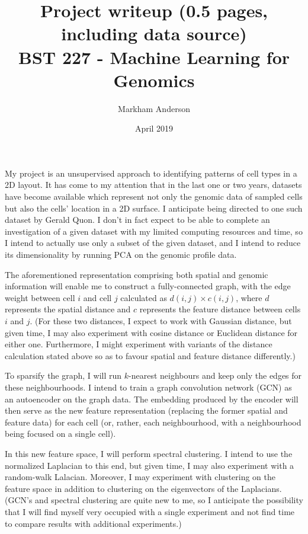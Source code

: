 \documentclass{article}
\title{Project writeup (0.5 pages, including data source) \\
\large BST 227 - Machine Learning for Genomics}
\author{Markham Anderson}
\date{April 2019}
\begin{document}
\maketitle


\normalsize
My project is an unsupervised approach to identifying patterns of cell types in a 2D layout. It has come to my attention that in the last one or two years, datasets have become available which represent not only the genomic data of sampled cells but also the cells' location in a 2D surface. I anticipate being directed to one such dataset by Gerald Quon. I don't in fact expect to be able to complete an investigation of a given dataset with my limited computing resources and time, so I intend to actually use only a subset of the given dataset, and I intend to reduce its dimensionality by running PCA on the genomic profile data.

The aforementioned representation comprising both spatial and genomic information will enable me to construct a fully-connected graph, with the edge weight between cell $i$ and cell $j$ calculated as $d(i,j)\times c(i,j)$, where $d$ represents the spatial distance and $c$ represents the feature distance between cells $i$ and $j$. (For these two distances, I expect to work with Gaussian distance, but given time, I may also experiment with cosine distance or Euclidean distance for either one. Furthermore, I might experiment with variants of the distance calculation stated above so as to favour spatial and feature distance differently.)

To sparsify the graph, I will run $k$-nearest neighbours and keep only the edges for these neighbourhoods. I intend to train a graph convolution network (GCN) as an autoencoder on the graph data. The embedding produced by the encoder will then serve as the new feature representation (replacing the former spatial and feature data) for each cell (or, rather, each neighbourhood, with a neighbourhood being focused on a single cell).

In this new feature space, I will perform spectral clustering. I intend to use the normalized Laplacian to this end, but given time, I may also experiment with a random-walk Lalacian. Moreover, I may experiment with clustering on the feature space in addition to clustering on the eigenvectors of the Laplacians. (GCN's and spectral clustering are quite new to me, so I anticipate the possibility that I will find myself very occupied with a single experiment and not find time to compare results with additional experiments.)
\end{document}
